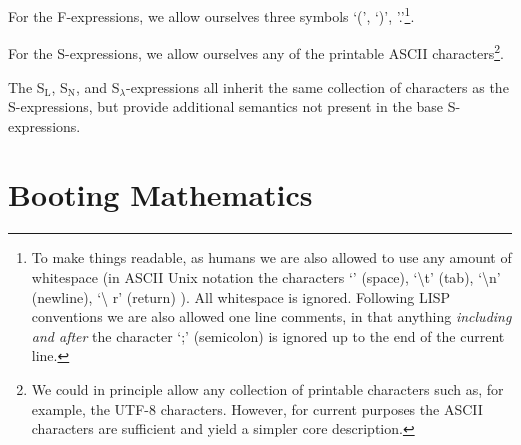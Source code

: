 For the F-expressions, we allow ourselves three symbols `(', `)',
'.'\footnote{To make things readable, as humans we are also allowed to use any
amount of whitespace (in ASCII Unix notation the characters `\textvisiblespace'
(space), `\textbackslash t' (tab), `\textbackslash n' (newline), `\textbackslash
r' (return) ). All whitespace is ignored. Following LISP conventions we are also
allowed one line comments, in that anything \emph{including and after} the
character `;' (semicolon) is ignored up to the end of the current line.}.

For the S-expressions, we allow ourselves any of the printable ASCII
characters\footnote{We could in principle allow any collection of printable
characters such as, for example, the UTF-8 characters. However, for current
purposes the ASCII characters are sufficient and yield a simpler core
description.}.

The S$_{\text{L}}$, S$_{\text{N}}$, and S$_{\lambda}$-expressions all inherit
the same collection of characters as the S-expressions, but provide additional
semantics not present in the base S-expressions.

\section{Booting Mathematics}

